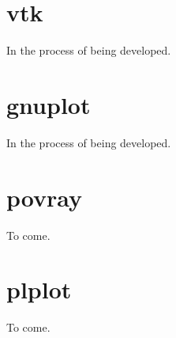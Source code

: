 \section{vtk}

In the process of being developed.

\section{gnuplot}

In the process of being developed.

\section{povray}

To come.

\section{plplot}

To come.

